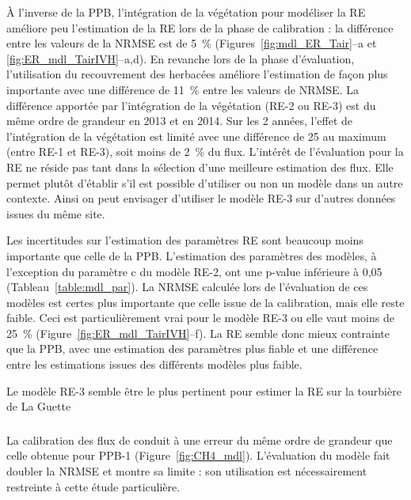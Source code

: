 À l'inverse de la PPB, l'intégration de la végétation pour modéliser la RE améliore peu l'estimation de la RE lors de la phase de calibration : la différence entre les valeurs de la NRMSE est de \SI{5}{\percent} (Figures~\ref{fig:mdl_ER_Tair}--a et \ref{fig:ER_mdl_TairIVH}--a,d).
En revanche lors de la phase d'évaluation, l'utilisation du recouvrement des herbacées améliore l'estimation de façon plus importante avec une différence de \SI{11}{\percent} entre les valeurs de NRMSE.
La différence apportée par l'intégration de la végétation (RE-2 ou RE-3) est du même ordre de grandeur en 2013 et en 2014.
Sur les 2 années, l'effet de l'intégration de la végétation est limité avec une différence de \SI{25}{\gcma} au maximum (entre RE-1 et RE-3), soit moins de \SI{2}{\percent} du flux.
L'intérêt de l'évaluation pour la RE ne réside pas tant dans la sélection d'une meilleure estimation des flux.
Elle permet plutôt d'établir s'il est possible d'utiliser ou non un modèle dans un autre contexte.
Ainsi on peut envisager d'utiliser le modèle RE-3 sur d'autres données issues du même site.

Les incertitudes sur l'estimation des paramètres RE sont beaucoup moins importante que celle de la PPB.
L'estimation des paramètres des modèles, à l'exception du paramètre c du modèle RE-2, ont une p-value inférieure à 0,05 (Tableau~\ref{table:mdl_par}).
La NRMSE calculée lors de l'évaluation de ces modèles est certes plus importante que celle issue de la calibration, mais elle reste faible.
Ceci est particulièrement vrai pour le modèle RE-3 ou elle vaut moins de \SI{25}{\percent} (Figure~\ref{fig:ER_mdl_TairIVH}--f).
La RE semble donc mieux contrainte que la PPB, avec une estimation des paramètres plus fiable et une différence entre les estimations issues des différents modèles plus faible.

Le modèle RE-3 semble être le plus pertinent pour estimer la RE sur la tourbière de La Guette

\subsubsection{\fchh}
La calibration des flux de \chh conduit à une erreur du même ordre de grandeur que celle obtenue pour PPB-1 (Figure~\ref{fig:CH4_mdl}). 
L'évaluation du modèle fait doubler la NRMSE et montre sa limite : son utilisation est nécessairement restreinte à cette étude particulière.


